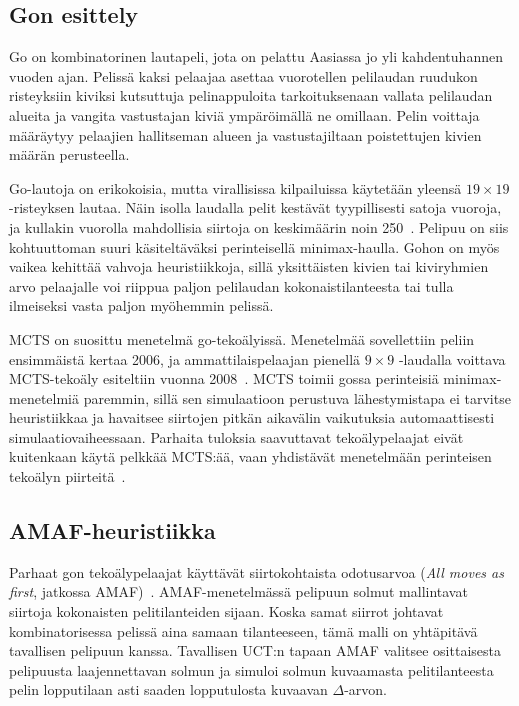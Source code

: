\documentclass[12pt,finnish]{tktltiki2}
\theoremstyle{definition}
\theoremstyle{remark}
\begin{document}
\subsection{Gon esittely}

Go on kombinatorinen lautapeli, jota on pelattu Aasiassa jo yli kahdentuhannen vuoden ajan. Pelissä kaksi pelaajaa asettaa vuorotellen pelilaudan ruudukon risteyksiin kiviksi kutsuttuja pelinappuloita tarkoituksenaan vallata pelilaudan alueita ja vangita vastustajan kiviä ympäröimällä ne omillaan. Pelin voittaja määräytyy pelaajien hallitseman alueen ja vastustajiltaan poistettujen kivien määrän perusteella.

Go-lautoja on erikokoisia, mutta virallisissa kilpailuissa käytetään yleensä $19 \times 19$ -risteyksen lautaa. Näin isolla laudalla pelit kestävät tyypillisesti satoja vuoroja, ja kullakin vuorolla mahdollisia siirtoja on keskimäärin noin 250~\cite{browne}. Pelipuu on siis kohtuuttoman suuri käsiteltäväksi perinteisellä minimax-haulla. Gohon on myös vaikea kehittää vahvoja heuristiikkoja, sillä yksittäisten kivien tai kiviryhmien arvo pelaajalle voi riippua paljon pelilaudan kokonaistilanteesta tai tulla ilmeiseksi vasta paljon myöhemmin pelissä.

MCTS on suosittu menetelmä go-tekoälyissä. Menetelmää sovellettiin peliin ensimmäistä kertaa 2006, ja ammattilaispelaajan pienellä $9 \times 9$ -laudalla voittava MCTS-tekoäly esiteltiin vuonna 2008~\cite{browne}. MCTS toimii gossa perinteisiä minimax-menetelmiä paremmin, sillä sen simulaatioon perustuva lähestymistapa ei tarvitse heuristiikkaa ja havaitsee siirtojen pitkän aikavälin vaikutuksia automaattisesti simulaatiovaiheessaan. Parhaita tuloksia saavuttavat tekoälypelaajat eivät kuitenkaan käytä pelkkää MCTS:ää, vaan yhdistävät menetelmään perinteisen tekoälyn piirteitä~\cite{browne}.

\subsection{AMAF-heuristiikka}

Parhaat gon tekoälypelaajat käyttävät siirtokohtaista odotusarvoa (\textit{All moves as first}, jatkossa AMAF)~\cite{browne}. AMAF-menetelmässä pelipuun solmut mallintavat siirtoja kokonaisten pelitilanteiden sijaan. Koska samat siirrot johtavat kombinatorisessa pelissä aina samaan tilanteeseen, tämä malli on yhtäpitävä tavallisen pelipuun kanssa. Tavallisen UCT:n tapaan AMAF valitsee osittaisesta pelipuusta laajennettavan solmun ja simuloi solmun kuvaamasta pelitilanteesta pelin lopputilaan asti saaden lopputulosta kuvaavan $\Delta$-arvon.
\end{document}
